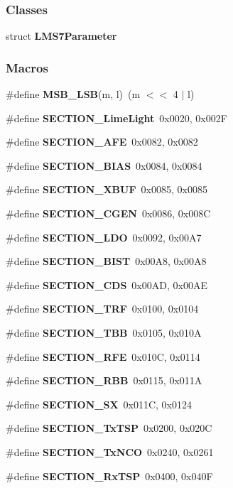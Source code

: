 \subsubsection*{Classes}
\begin{DoxyCompactItemize}
\item 
struct {\bf L\+M\+S7\+Parameter}
\end{DoxyCompactItemize}
\subsubsection*{Macros}
\begin{DoxyCompactItemize}
\item 
\#define {\bf M\+S\+B\+\_\+\+L\+SB}(m,  l)~(m $<$$<$ 4 $\vert$ l)
\item 
\#define {\bf S\+E\+C\+T\+I\+O\+N\+\_\+\+Lime\+Light}~0x0020, 0x002F
\item 
\#define {\bf S\+E\+C\+T\+I\+O\+N\+\_\+\+A\+FE}~0x0082, 0x0082
\item 
\#define {\bf S\+E\+C\+T\+I\+O\+N\+\_\+\+B\+I\+AS}~0x0084, 0x0084
\item 
\#define {\bf S\+E\+C\+T\+I\+O\+N\+\_\+\+X\+B\+UF}~0x0085, 0x0085
\item 
\#define {\bf S\+E\+C\+T\+I\+O\+N\+\_\+\+C\+G\+EN}~0x0086, 0x008C
\item 
\#define {\bf S\+E\+C\+T\+I\+O\+N\+\_\+\+L\+DO}~0x0092, 0x00\+A7
\item 
\#define {\bf S\+E\+C\+T\+I\+O\+N\+\_\+\+B\+I\+ST}~0x00\+A8, 0x00\+A8
\item 
\#define {\bf S\+E\+C\+T\+I\+O\+N\+\_\+\+C\+DS}~0x00\+A\+D, 0x00\+AE
\item 
\#define {\bf S\+E\+C\+T\+I\+O\+N\+\_\+\+T\+RF}~0x0100, 0x0104
\item 
\#define {\bf S\+E\+C\+T\+I\+O\+N\+\_\+\+T\+BB}~0x0105, 0x010A
\item 
\#define {\bf S\+E\+C\+T\+I\+O\+N\+\_\+\+R\+FE}~0x010\+C, 0x0114
\item 
\#define {\bf S\+E\+C\+T\+I\+O\+N\+\_\+\+R\+BB}~0x0115, 0x011A
\item 
\#define {\bf S\+E\+C\+T\+I\+O\+N\+\_\+\+SX}~0x011\+C, 0x0124
\item 
\#define {\bf S\+E\+C\+T\+I\+O\+N\+\_\+\+Tx\+T\+SP}~0x0200, 0x020C
\item 
\#define {\bf S\+E\+C\+T\+I\+O\+N\+\_\+\+Tx\+N\+CO}~0x0240, 0x0261
\item 
\#define {\bf S\+E\+C\+T\+I\+O\+N\+\_\+\+Rx\+T\+SP}~0x0400, 0x040F
\item 
$$
\end{DoxyCompactItemize}
